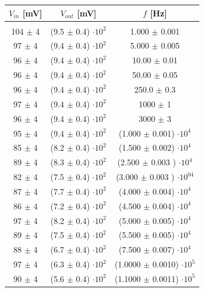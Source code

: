 \documentclass[journal]{IEEEtran}
\begin{document}
\begin{table}[H]
\begin{tabular}{c|c|c}
\multicolumn{1}{c|}{$V_{in}$ {[}mV{]}} & \multicolumn{1}{|c|}{$V_{out}$ {[}mV{]}} & \multicolumn{1}{c}{$f$ {[}Hz{]}}\\ 
\hline  \\
104 $ \pm $ 4 & (9.5 $ \pm $ 0.4) $ \cdot 10^{2} $ & 1.000 $ \pm $ 0.001       \\
97 $ \pm $ 4  & (9.4 $ \pm $ 0.4) $ \cdot 10^{2} $ & 5.000 $ \pm $ 0.005         \\
96 $ \pm $ 4  & (9.4 $ \pm $ 0.4) $ \cdot 10^{2} $ & 10.00 $ \pm $ 0.01        \\
96 $ \pm $ 4  & (9.4 $ \pm $ 0.4) $ \cdot 10^{2} $ & 50.00 $ \pm $ 0.05          \\
96 $ \pm $ 4  & (9.4 $ \pm $ 0.4) $ \cdot 10^{2} $ & 250.0 $ \pm $ 0.3         \\
97 $ \pm $ 4  & (9.4 $ \pm $ 0.4) $ \cdot 10^{2} $ & 1000 $ \pm $ 1          \\
96 $ \pm $ 4  & (9.4 $ \pm $ 0.4) $ \cdot 10^{2} $ & 3000 $ \pm $ 3          \\
95 $ \pm $ 4  & (9.4 $ \pm $ 0.4) $ \cdot 10^{2} $ & (1.000 $ \pm $ 0.001)  $ \cdot 10^{4} $            \\
85 $ \pm $ 4  & (8.2 $ \pm $ 0.4) $ \cdot 10^{2} $ & (1.500 $ \pm $ 0.002)   $ \cdot 10^{4} $          \\
89 $ \pm $ 4  & (8.3 $ \pm $ 0.4) $ \cdot 10^{2} $ & (2.500 $ \pm $ 0.003 ) $ \cdot 10^{4} $             \\
82 $ \pm $ 4  & (7.5 $ \pm $ 0.4) $ \cdot 10^{2} $ & (3.000 $ \pm $ 0.003 ) $ \cdot 10^{04} $             \\
87 $ \pm $ 4  & (7.7 $ \pm $ 0.4) $ \cdot 10^{2} $ & (4.000 $ \pm $ 0.004) $ \cdot 10^{4} $   \\
86 $ \pm $ 4  & (7.2 $ \pm $ 0.4) $ \cdot 10^{2} $ & (4.500 $ \pm $ 0.004) $ \cdot 10^{4} $   \\
97 $ \pm $ 4  & (8.2 $ \pm $ 0.4) $ \cdot 10^{2} $ & (5.000 $ \pm $ 0.005) $ \cdot 10^{4} $   \\
89 $ \pm $ 4  & (7.5 $ \pm $ 0.4) $ \cdot 10^{2} $ & (5.500 $ \pm $ 0.005) $ \cdot 10^{4} $   \\
88 $ \pm $ 4  & (6.7 $ \pm $ 0.4) $ \cdot 10^{2} $ & (7.500 $ \pm $ 0.007) $ \cdot 10^{4} $   \\
97 $ \pm $ 4  & (6.3 $ \pm $ 0.4) $ \cdot 10^{2} $ & (1.0000 $ \pm $ 0.0010) $ \cdot 10^{5} $ \\
90 $ \pm $ 4  & (5.6 $ \pm $ 0.4) $ \cdot 10^{2} $ & (1.1000 $ \pm $ 0.0011) $ \cdot 10^{5} $ \\

\end{tabular}
\end{table}
\end{document}
